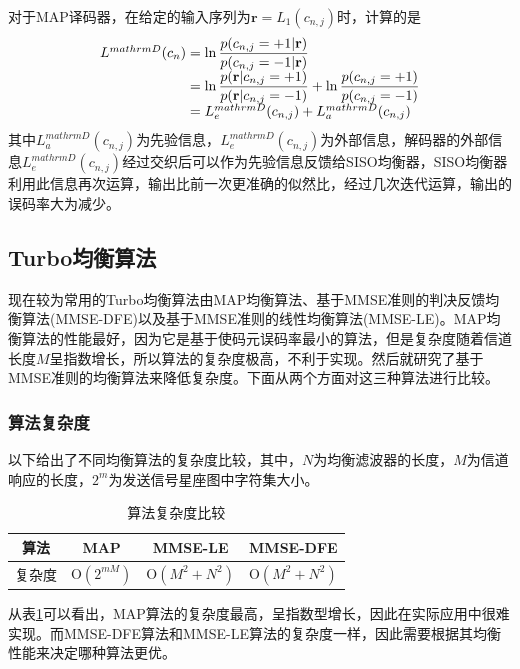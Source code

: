 对于MAP译码器，在给定的输入序列为$\mathbf{r}={L_1(c_{n,j})}$时，计算的是
\begin{eqnarray}
    \begin{array}{l@{\;=\;}l}
        L^{mathrm{D}}(c_n)&\ln\dfrac{p(c_{n,j}=+1|\mathbf{r})}{p(c_{n,j}=-1|\mathbf{r})}\\
        &\ln\dfrac{p(\mathbf{r}|c_{n,j}=+1)}{p(\mathbf{r}|c_{n,j}=-1)}+\ln\dfrac{p(c_{n,j}=+1)}{p(c_{n,j}=-1)}\\
        &L_e^{mathrm{D}}(c_{n,j})+L_a^{mathrm{D}}(c_{n,j})
    \end{array}
    \label{equ:2.34}
\end{eqnarray}
其中$L_a^{mathrm{D}}(c_{n,j})$为先验信息，$L_e^{mathrm{D}}(c_{n,j})$为外部信息，解码器的外部信息$L_e^{mathrm{D}}(c_{n,j})$经过交织后可以作为先验信息反馈给SISO均衡器，SISO均衡器利用此信息再次运算，输出比前一次更准确的似然比，经过几次迭代运算，输出的误码率大为减少。
\subsection{Turbo均衡算法}
现在较为常用的Turbo均衡算法由MAP均衡算法、基于MMSE准则的判决反馈均衡算法(MMSE-DFE)以及基于MMSE准则的线性均衡算法(MMSE-LE)。MAP均衡算法的性能最好，因为它是基于使码元误码率最小的算法，但是复杂度随着信道长度$M$呈指数增长，所以算法的复杂度极高，不利于实现。然后就研究了基于MMSE准则的均衡算法来降低复杂度。下面从两个方面对这三种算法进行比较。

\subsubsection*{算法复杂度}
以下给出了不同均衡算法的复杂度比较，其中，$N$为均衡滤波器的长度，$M$为信道响应的长度，$2^m$为发送信号星座图中字符集大小。

\begin{table}[hbt]
  \centering
  \caption{算法复杂度比较}
  \label{tab:2.1}
  \begin{threeparttable}
  \begin{tabular}{cccc}
    \hline
    算法&MAP&MMSE-LE&MMSE-DFE\\
    \hline
    复杂度&$\mathrm{O}(2^{mM})$&$\mathrm{O}(M^2+N^2)$&$\mathrm{O}(M^2+N^2)$\\
    \hline
  \end{tabular}
\end{threeparttable}
\end{table}

从表\ref{tab:2.1}可以看出，MAP算法的复杂度最高，呈指数型增长，因此在实际应用中很难实现。而MMSE-DFE算法和MMSE-LE算法的复杂度一样，因此需要根据其均衡性能来决定哪种算法更优。
